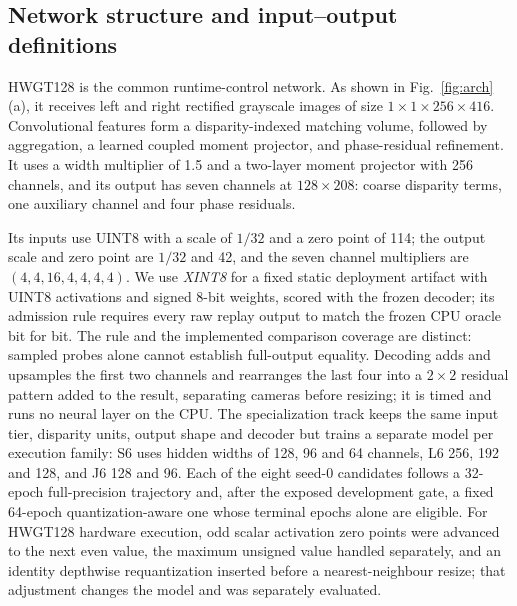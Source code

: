 \documentclass[sigconf,review,anonymous]{acmart}
\begin{document}
\subsection{Network structure and input--output definitions}
HWGT128 is the common runtime-control network. As shown in Fig.~\ref{fig:arch}(a), it receives left and right rectified grayscale images of size $1\times1\times256\times416$. Convolutional features form a disparity-indexed matching volume, followed by aggregation, a learned coupled moment projector, and phase-residual refinement. It uses a width multiplier of 1.5 and a two-layer moment projector with 256 channels, and its output has seven channels at $128\times208$: coarse disparity terms, one auxiliary channel and four phase residuals.

Its inputs use UINT8 with a scale of $1/32$ and a zero point of 114; the output scale and zero point are $1/32$ and 42, and the seven channel multipliers are $(4,4,16,4,4,4,4)$. We use \emph{XINT8} for a fixed static deployment artifact with UINT8 activations and signed 8-bit weights, scored with the frozen decoder; its admission rule requires every raw replay output to match the frozen CPU oracle bit for bit. The rule and the implemented comparison coverage are distinct: sampled probes alone cannot establish full-output equality. Decoding adds and upsamples the first two channels and rearranges the last four into a $2\times2$ residual pattern added to the result, separating cameras before resizing; it is timed and runs no neural layer on the CPU. The specialization track keeps the same input tier, disparity units, output shape and decoder but trains a separate model per execution family: S6 uses hidden widths of 128, 96 and 64 channels, L6 256, 192 and 128, and J6 128 and 96. Each of the eight seed-0 candidates follows a 32-epoch full-precision trajectory and, after the exposed development gate, a fixed 64-epoch quantization-aware one whose terminal epochs alone are eligible. For HWGT128 hardware execution, odd scalar activation zero points were advanced to the next even value, the maximum unsigned value handled separately, and an identity depthwise requantization inserted before a nearest-neighbour resize; that adjustment changes the model and was separately evaluated.
\end{document}
